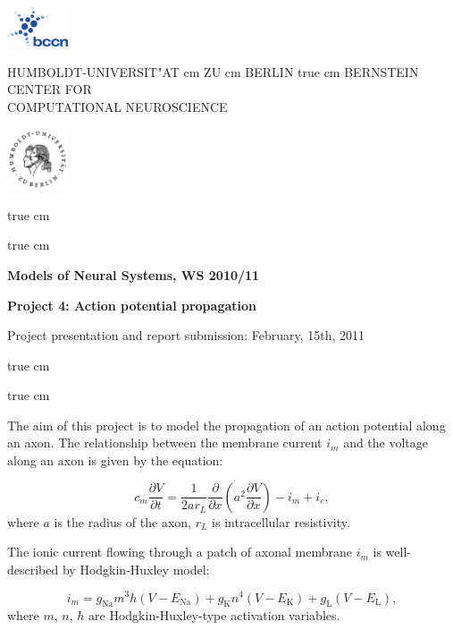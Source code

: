 \documentclass[12pt]{article}
\begin{document}
\parbox{2cm}{
\includegraphics[width=1.8cm]{../bccnlogo.pdf}
}
\parbox{11cm}{
\begin{center}
\large HUMBOLDT-UNIVERSIT"AT  cm ZU  cm BERLIN
 true cm
\mgross BERNSTEIN CENTER FOR\\ COMPUTATIONAL NEUROSCIENCE
\end{center}
}
\parbox{2cm}
{
\hfill
\includegraphics[width=1.8cm]{../hublogo.pdf}
}

 true cm



 true cm
\centerline{\bf Models of Neural Systems, WS 2010/11}
\centerline{\bf Project 4: Action potential propagation}
\centerline{Project presentation and report submission: February,
15th, 2011}

 true cm

\newcommand{\Na}{\mathrm{Na}}
\newcommand{\K}{\mathrm{K}}
\newcommand{\Leak}{\mathrm{L}}

 true cm

\noindent The aim of this project is to model the propagation of an action
potential along an axon. The relationship between the membrane current
$i_m$ and the voltage along an axon is given by the equation:

\begin{equation}
    c_m\frac{\partial V}{\partial t} =
    \frac{1}{2ar_L}\frac{\partial}{\partial
    x}\left(a^2\frac{\partial V}{\partial x}\right)-i_m+i_e,
\end{equation}
where $a$ is the radius of the axon, $r_L$ is intracellular
resistivity.

The ionic current flowing through a patch of axonal membrane $i_m$ is
well-described by Hodgkin-Huxley model:

\begin{equation}
    i_m=g_\Na m^3h(V-E_\Na)+g_\K n^4(V-E_\K)+g_\Leak(V-E_\Leak),
\end{equation}
where $m$, $n$, $h$ are Hodgkin-Huxley-type activation variables.
\end{document}
